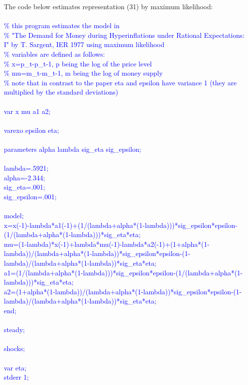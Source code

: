 \documentclass[a4paper,12pt]{scrartcl} %
\begin{document}
The code below estimates representation (31) by maximum likelihood:\\
\\
\textcolor{blue}{
\% this program estimates the model in\\
\% "The Demand for Money during Hyperinflations under Rational Expectations: I" by T. Sargent, IER 1977 using maximum likelihood\\
\% variables are defined as follows:\\
\% x=p\_t-p\_{t-1}, p being the log of the price level\\
\% mu=m\_t-m\_{t-1}, m being the log of money supply\\
\% note that in contrast to the paper eta and epsilon have variance 1 (they are multiplied by the standard deviations)\\
\\
var x mu a1 a2;\\
\\
varexo epsilon eta;\\
\\
parameters alpha lambda sig\_eta sig\_epsilon;\\
\\
lambda=.5921;\\
alpha=-2.344;\\
sig\_eta=.001;\\
sig\_epsilon=.001;\\
\\
model;\\
x=x(-1)-lambda*a1(-1)+(1/(lambda+alpha*(1-lambda)))*sig\_epsilon*epsilon-(1/(lambda+alpha*(1-lambda)))*sig\_eta*eta;\\
mu=(1-lambda)*x(-1)+lambda*mu(-1)-lambda*a2(-1)+(1+alpha*(1-lambda))/(lambda+alpha*(1-lambda))*sig\_epsilon*epsilon-(1-lambda)/(lambda+alpha*(1-lambda))*sig\_eta*eta;\\
a1=(1/(lambda+alpha*(1-lambda)))*sig\_epsilon*epsilon-(1/(lambda+alpha*(1-lambda)))*sig\_eta*eta;\\
a2=(1+alpha*(1-lambda))/(lambda+alpha*(1-lambda))*sig\_epsilon*epsilon-(1-lambda)/(lambda+alpha*(1-lambda))*sig\_eta*eta;\\
end;\\
\\
steady;\\
\\
shocks;\\
\\
var eta;\\
stderr 1;\\
}
\end{document}
